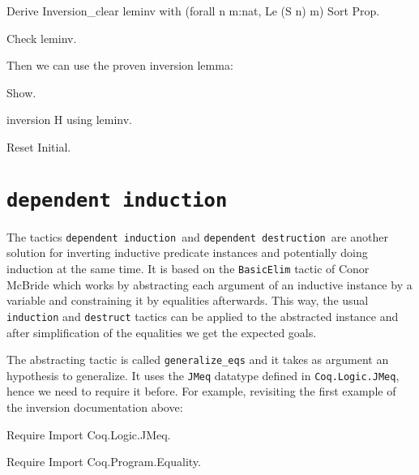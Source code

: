 \begin{coq_example*}
\begin{coq_example*}
Derive Inversion_clear leminv with (forall n m:nat, Le (S n) m) Sort
 Prop.
\end{coq_example*}

\begin{coq_example}
Check leminv.
\end{coq_example}

Then we can use the proven inversion lemma:

\begin{coq_example}
Show.
\end{coq_example}

\begin{coq_example}
inversion H using leminv.
\end{coq_example}

\begin{coq_eval}
Reset Initial.
\end{coq_eval}

\section[\tt dependent induction]{\tt dependent induction\label{dependent-induction-example}}
\def\depind{{\tt dependent induction}~}
\def\depdestr{{\tt dependent destruction}~}

The tactics \depind and \depdestr are another solution for inverting
inductive predicate instances and potentially doing induction at the
same time. It is based on the \texttt{BasicElim} tactic of Conor McBride which
works by abstracting each argument of an inductive instance by a variable
and constraining it by equalities afterwards. This way, the usual 
{\tt induction} and {\tt destruct} tactics can be applied to the
abstracted instance and after simplification of the equalities we get
the expected goals.

The abstracting tactic is called {\tt generalize\_eqs} and it takes as
argument an hypothesis to generalize. It uses the {\tt JMeq} datatype
defined in {\tt Coq.Logic.JMeq}, hence we need to require it before.
For example, revisiting the first example of the inversion documentation above:

\begin{coq_example*}
Require Import Coq.Logic.JMeq.
\end{coq_example*}
\begin{coq_eval}
Require Import Coq.Program.Equality.
\end{coq_eval}


\end{coq_example*}
